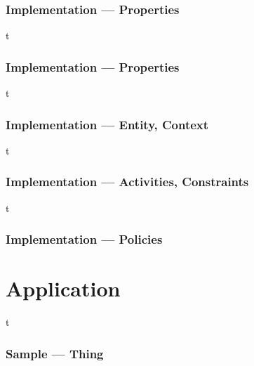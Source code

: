 \documentclass[t, 10pt]{beamer}
\begin{document}
\begin{frame}[t]
\frametitle{Implementation --- Properties}

\end{frame}

\begin{frame}{t}
\frametitle{Implementation --- Properties}

\end{frame}

\begin{frame}{t}
\frametitle{Implementation --- Entity, Context}

\pause

\end{frame}

\begin{frame}{t}
\frametitle{Implementation --- Activities, Constraints}

\pause

\end{frame}


\begin{frame}{t}
\frametitle{Implementation --- Policies}

\pause

\end{frame}


\section{Application}
\begin{frame}{t}
\frametitle{Sample --- Thing}
\begin{columns}[t]
\end{columns}
\end{frame}
\end{document}
